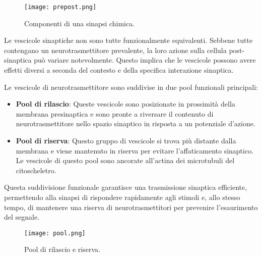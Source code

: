 \begin{figure}[h]
    \centering
    \texttt{[image: prepost.png]}
    \caption{Componenti di una sinapsi chimica.}
    \label{fig:prepost}
\end{figure}

Le vescicole sinaptiche non sono tutte funzionalmente equivalenti. Sebbene tutte contengano un neurotrasmettitore prevalente, la loro azione sulla cellula post-sinaptica può variare notevolmente. Questo implica che le vescicole possono avere effetti diversi a seconda del contesto e della specifica interazione sinaptica.

Le vescicole di neurotrasmettitore sono suddivise in due pool funzionali principali:

\begin{itemize}
    \item \textbf{Pool di rilascio}: Queste vescicole sono posizionate in prossimità della membrana presinaptica e sono pronte a riversare il contenuto di neurotrasmettitore nello spazio sinaptico in risposta a un potenziale d'azione.
    
    \item \textbf{Pool di riserva}: Questo gruppo di vescicole si trova più distante dalla membrana e viene mantenuto in riserva per evitare l'affaticamento sinaptico. Le vescicole di questo pool sono ancorate all'actina dei microtubuli del citoscheletro.
\end{itemize}

Questa suddivisione funzionale garantisce una trasmissione sinaptica efficiente, permettendo alla sinapsi di rispondere rapidamente agli stimoli e, allo stesso tempo, di mantenere una riserva di neurotrasmettitori per prevenire l'esaurimento del segnale.

\begin{figure}[h]
    \centering
    \texttt{[image: pool.png]}
    \caption{Pool di rilascio e riserva.}
    \label{fig:pool}
\end{figure}

